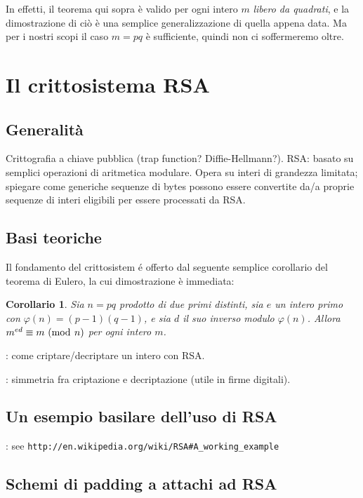 \documentclass[pdflatex,11pt,a4paper,oneside]{article}
\newcommand{\XXX}[1][XXX]{\text{\bfseries{\color{red}{\emph{#1}}}}}
\newcommand{\TODO}[0]{\XXX[TODO]}
\newcommand{\p}[1]{\left({#1}\right)}
\renewcommand{\phi}{\varphi}
\newcommand{\ephi}[1]{\ensuremath{\phi\p{#1}}}
\newcommand{\congruent}[0]{\equiv}
\newcommand{\mmodop}[0]{\ensuremath{\operatorname{mod}}}
\newcommand{\mmod}[1]{\ensuremath{\allowbreak\ (\mmodop\:{#1})}}
\newtheorem{corollary}[TheoremLike]{Corollario}
\begin{document}
In effetti, il teorema qui sopra \`e valido per ogni intero $m$
\emph{libero da quadrati}, e la dimostrazione di ci\`o \`e una
semplice generalizzazione di quella appena data.  Ma per i nostri
scopi il caso $m = pq$ \`e sufficiente, quindi non ci soffermeremo
oltre.


\section{Il crittosistema RSA}

\subsection{Generalit\`a}

Crittografia a chiave pubblica (trap function? Diffie-Hellmann?).
RSA: basato su semplici operazioni di aritmetica modulare. Opera su
interi di grandezza limitata; spiegare come generiche sequenze di
bytes possono essere convertite da/a proprie sequenze di interi
eligibili per essere processati da RSA.

\subsection{Basi teoriche}

Il fondamento del crittosistem \'e offerto dal seguente semplice
corollario del teorema di Eulero, la cui dimostrazione \`e immediata:

\begin{corollary}
Sia $n = pq$ prodotto di due primi distinti, sia $e$ un intero primo con
$\ephi{n} = (p-1)(q-1)$, e sia $d$ il suo inverso modulo $\ephi{n}$.
Allora $m^{ed} \congruent m \mmod n$ per ogni intero $m$.
\end{corollary}

\TODO: come criptare/decriptare un intero con RSA.

\TODO: simmetria fra criptazione e decriptazione (utile in firme digitali).

\subsection{Un esempio basilare dell'uso di RSA}

\TODO: see \verb+http://en.wikipedia.org/wiki/RSA#A_working_example+

\subsection{Schemi di padding a attachi ad RSA}
\end{document}
